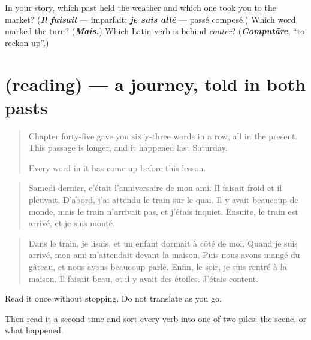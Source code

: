 \begin{tcolorbox}[breakable,colback=teal!4,colframe=teal!35!black,title={Before you move on}]
In your story, which past held the weather and which one took you to the market? (\emph{\textbf{Il faisait}} — imparfait; \emph{\textbf{je suis allé}} — passé composé.) Which word marked the turn? (\emph{\textbf{Mais.}}) Which Latin verb is behind \emph{conter}? (\emph{\textbf{Computāre}}, \textquotedblleft{}to reckon up\textquotedblright{}.)
\end{tcolorbox}
\section[(reading)]{(reading) — a journey, told in both pasts}

\label{lesson:FR-C259-lecture}



\begin{quote}
Chapter forty-five gave you sixty-three words in a row, all in the present. This passage is longer, and it happened last Saturday.

Every word in it has come up before this lesson.
\end{quote}

\begin{tcolorbox}[breakable,skin=enhanced,colback=orange!6,colframe=orange!45!black,boxrule=0.5pt,arc=1mm,left=6pt,right=6pt,top=4pt,bottom=4pt,fonttitle=\bfseries,title={Read this}]
\begin{quote}
Samedi dernier, c'était l'anniversaire de mon ami. Il faisait froid et il pleuvait. D'abord, j'ai attendu le train sur le quai. Il y avait beaucoup de monde, mais le train n'arrivait pas, et j'étais inquiet. Ensuite, le train est arrivé, et je suis monté.
\end{quote}

\begin{quote}
Dans le train, je lisais, et un enfant dormait à côté de moi. Quand je suis arrivé, mon ami m'attendait devant la maison. Puis nous avons mangé du gâteau, et nous avons beaucoup parlé. Enfin, le soir, je suis rentré à la maison. Il faisait beau, et il y avait des étoiles. J'étais content.
\end{quote}

Read it once without stopping. Do not translate as you go.

Then read it a second time and sort every verb into one of two piles: the scene, or what happened.
\end{tcolorbox}

